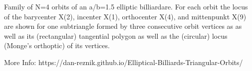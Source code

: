 Family of N=4 orbits of an a/b=1.5 elliptic billiardare. For each orbit the locus of the barycenter X(2), incenter X(1), orthocenter X(4), and mittenpunkt X(9) are shown for one subtriangle formed by three consecutive orbit vertices as as well as its (rectangular) tangential polygon as well as the (circular) locus (Monge's orthoptic) of its vertices.

More Info: https://dan-reznik.github.io/Elliptical-Billiards-Triangular-Orbits/